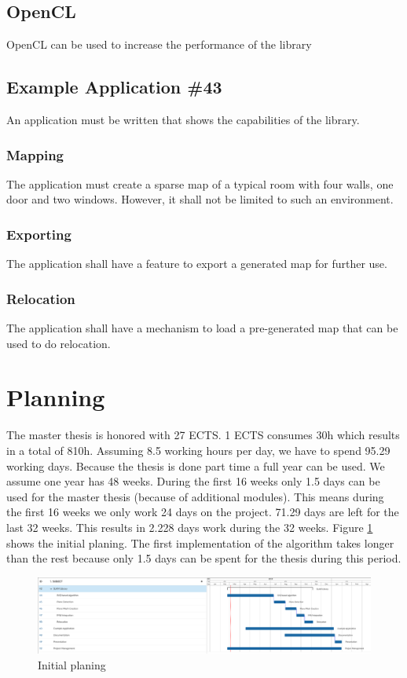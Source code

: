 \documentclass[11pt,a4paper,titlepage,oneside]{report}
\begin{document}
\subsection{OpenCL}
OpenCL can be used to increase the performance of the library
\subsection{Example Application \#43}
An application must be written that shows the capabilities of the library. 
\subsubsection{Mapping}
The application must create a sparse map of a typical room with four walls, one door and two windows. However, it shall not be limited to such an environment.
\subsubsection{Exporting}
The application shall have a feature to export a generated map for further use.
\subsubsection{Relocation}
The application shall have a mechanism to load a pre-generated map that can be used to do relocation.

\section{Planning}
The master thesis is honored with 27 ECTS. 1 ECTS consumes 30h which results in a total of 810h. Assuming 8.5 working hours per day, we have to spend 95.29 working days. Because the thesis is done part time a full year can be used. We assume one year has 48 weeks. During the first 16 weeks only 1.5 days can be used for the master thesis (because of additional modules). This means during the first 16 weeks we only work 24 days on the project. 71.29 days are left for the last 32 weeks. This results in 2.228 days work during the 32 weeks. Figure \ref{fig:gantt} shows the initial planing. The first implementation of the algorithm takes longer than the rest because only 1.5 days can be spent for the thesis during this period.

\begin{figure}[H]
	\includegraphics[width=1.0\textwidth]{img/gantt.png}
	\caption{Initial planing}\label{fig:gantt}
\end{figure}
\end{document}
